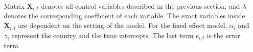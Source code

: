 Matrix $\mathbf{X}_{i, t}$ denotes all control variables described in the previous section, and $\lambda$ denotes the corresponding coefficient of each variable.
The exact variables inside $\mathbf{X}_{i,t}$ are dependent on the setting of the model.
For the fixed effect model, $\alpha_i$ and $\gamma_t$ represent the country and the time intercepts.
The last term $\epsilon_{i,t}$ is the error term.



